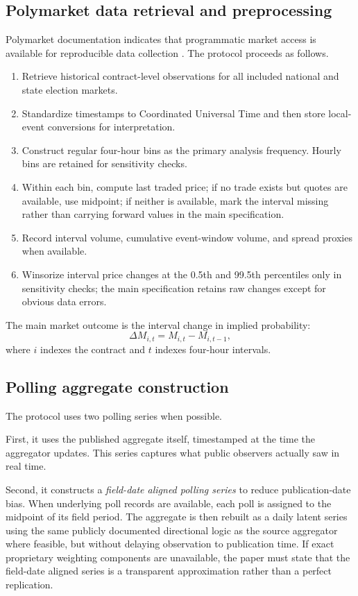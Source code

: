 \documentclass[11pt]{article}
\begin{document}
\subsection{Polymarket data retrieval and preprocessing}
Polymarket documentation indicates that programmatic market access is available for reproducible data collection \citep{introductionpolymandpolymark}. The protocol proceeds as follows.
\begin{enumerate}
\item Retrieve historical contract-level observations for all included national and state election markets.
\item Standardize timestamps to Coordinated Universal Time and then store local-event conversions for interpretation.
\item Construct regular four-hour bins as the primary analysis frequency. Hourly bins are retained for sensitivity checks.
\item Within each bin, compute last traded price; if no trade exists but quotes are available, use midpoint; if neither is available, mark the interval missing rather than carrying forward values in the main specification.
\item Record interval volume, cumulative event-window volume, and spread proxies when available.
\item Winsorize interval price changes at the 0.5th and 99.5th percentiles only in sensitivity checks; the main specification retains raw changes except for obvious data errors.
\end{enumerate}

The main market outcome is the interval change in implied probability:
\[
\Delta M_{i,t} = M_{i,t} - M_{i,t-1},
\]
where $i$ indexes the contract and $t$ indexes four-hour intervals.

\subsection{Polling aggregate construction}
The protocol uses two polling series when possible.

First, it uses the published aggregate itself, timestamped at the time the aggregator updates. This series captures what public observers actually saw in real time.

Second, it constructs a \emph{field-date aligned polling series} to reduce publication-date bias. When underlying poll records are available, each poll is assigned to the midpoint of its field period. The aggregate is then rebuilt as a daily latent series using the same publicly documented directional logic as the source aggregator where feasible, but without delaying observation to publication time. If exact proprietary weighting components are unavailable, the paper must state that the field-date aligned series is a transparent approximation rather than a perfect replication.
\end{document}
